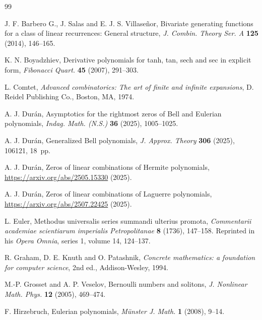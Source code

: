\documentclass[10pt, a4paper, leqno]{amsart}
\numberwithin{equation}{section}
\theoremstyle{plain}
\theoremstyle{remark}
\begin{document}
\begin{thebibliography}{99}

J. F. Barbero G., J. Salas and E. J. S. Villase\~nor,
Bivariate generating functions for a class of linear recurrences: General structure,
\textit{J. Combin. Theory Ser. A}
\textbf{125} (2014), 146--165.

K. N. Boyadzhiev,
Derivative polynomials for tanh, tan, sech and sec in explicit form,
\textit{Fibonacci Quart.} \textbf{45} (2007), 291--303. %

L. Comtet,
\textit{Advanced combinatorics: The art of finite and infinite expansions}, 
D. Reidel Publishing Co., Boston, MA, 1974.

A. J. Dur\'an,
Asymptotics for the rightmost zeros of Bell and Eulerian polynomials,
\textit{Indag. Math. (N.S.)}
\textbf{36} (2025), 1005--1025. %

A. J. Dur\'an,
Generalized Bell polynomials,
\textit{J. Approx. Theory}
\textbf{306} (2025), 106121, 18~pp.

A. J. Dur\'an,
Zeros of linear combinations of Hermite polynomials,
\url{https://arxiv.org/abs/2505.15330} (2025).

A. J. Dur\'an,
Zeros of linear combinations of Laguerre polynomials,
\url{https://arxiv.org/abs/2507.22425} (2025).

L. Euler,
Methodus universalis series summandi ulterius promota,
\textit{Commentarii academiae scientiarum imperialis Petropolitanae}
\textbf{8} (1736), 147--158.
Reprinted in his \textit{Opera Omnia}, series 1, volume 14, 124--137.

R. Graham, D. E. Knuth and O. Patashnik,
\textit{Concrete mathematics: a foundation for computer science},
2nd ed., Addison-Wesley, 1994.

M.-P. Grosset and A. P. Veselov,
Bernoulli numbers and solitons,
\textit{J. Nonlinear Math. Phys.}
\textbf{12} (2005), 469--474.

F. Hirzebruch,
{Eulerian polynomials},
\textit{M\"unster J. Math.}
\textbf{1} (2008), 9--14.


\end{thebibliography}
\end{document}
